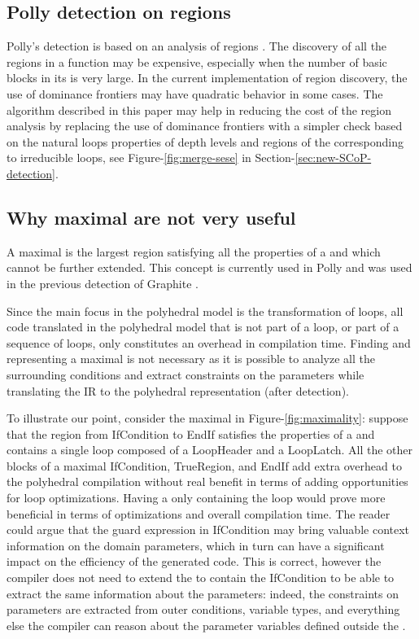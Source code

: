 \documentclass{sig-alternate}
\begin{document}
\subsection{Polly \SCoP{} detection on \SESE{} regions}
\label{subsec:polly-SCoP}
Polly's \SCoP{} detection is based on an analysis of \SESE{} regions \cite{polly}.
The discovery
of all the regions in a function may be expensive, especially when the number of
basic blocks in its \CFG{} is very large.  In the current \LLVM{} implementation of
\SESE{} region discovery, the use of dominance frontiers may have quadratic
behavior in some cases.  The algorithm described in this paper may help in
reducing the cost of the \SESE{} region analysis by replacing the use of dominance
frontiers with a simpler check based on the natural loops properties of depth
levels and regions of the \CFG{} corresponding to irreducible loops, see
Figure-\ref{fig:merge-sese} in Section-\ref{sec:new-SCoP-detection}.

\subsection{Why maximal  are not very useful}
\label{subsec:maximality}
A maximal \SCoP{} is the largest region satisfying all the properties of a \SCoP{} and
which cannot be further extended.  This concept is currently used in Polly
\cite{polly} and was used in the previous \SCoP{} detection of Graphite
\cite{graphite}.

Since the main focus in the polyhedral model is the transformation of loops, all
code translated in the polyhedral model that is not part of a loop, or part of a
sequence of loops, only constitutes an overhead in compilation time.  Finding
and representing a maximal \SCoP{} is not necessary as it is possible to analyze
all the surrounding conditions and extract constraints on the parameters while
translating the IR to the polyhedral representation (after \SCoP{} detection).

To illustrate our point, consider the maximal \SCoP{} in
Figure-\ref{fig:maximality}: suppose that the region from IfCondition to EndIf
satisfies the properties of a \SCoP{,} and contains a single loop composed of a
LoopHeader and a LoopLatch.  All the other blocks of a maximal \SCoP{}
IfCondition, TrueRegion, and EndIf add extra overhead to the polyhedral
compilation without real benefit in terms of adding opportunities for loop
optimizations.  Having a \SCoP{} only containing the loop would prove more
beneficial in terms of optimizations and overall compilation time.  The reader
could argue that the guard expression in IfCondition may bring valuable context
information on the domain parameters, which in turn can have a significant
impact on the efficiency of the generated code.  This is correct, however the
compiler does not need to extend the \SCoP{} to contain the IfCondition to be
able to extract the same information about the parameters: indeed, the
constraints on parameters are extracted from outer conditions, variable types,
and everything else the compiler can reason about the parameter variables
defined outside the \SCoP{}.
\end{document}
